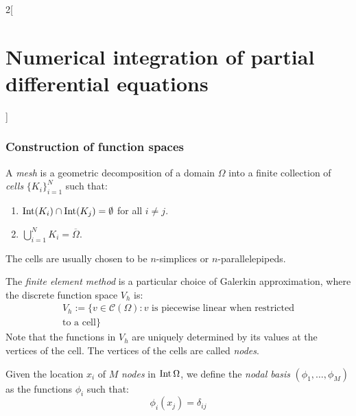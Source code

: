 \documentclass[../../../main_math.tex]{subfiles}
\begin{document}
\begin{multicols}{2}[\section{Numerical integration of partial differential equations}]
  \subsubsection{Construction of function spaces}
  \begin{definition}[Mesh]
    A \emph{mesh} is a geometric decomposition of a domain $\Omega$ into a finite collection of \emph{cells} ${\{K_i\}}_{i=1}^N$ such that:
    \begin{enumerate}
      \item $\operatorname{Int}(K_i) \cap \operatorname{Int}(K_j) = \emptyset$ for all $i\neq j$.
      \item $\bigcup_{i=1}^N K_i = \overline{\Omega}$.
    \end{enumerate}
    The cells are usually chosen to be $n$-simplices or $n$-parallelepipeds.
  \end{definition}
  \begin{definition}
    The \emph{finite element method} is a particular choice of Galerkin approximation, where the discrete function space
    $V_h$ is:
    \begin{multline*}
      V_h:=\{v\in\mathcal{C}(\Omega):v\text{ is piecewise linear when restricted}\\\text{to a cell}\}
    \end{multline*}
    Note that the functions in $V_h$ are uniquely determined by its values at the vertices of the cell. The vertices of the cells are called \emph{nodes}.
  \end{definition}
  \begin{definition}
    Given the location $x_i$ of $M$ \emph{nodes} in $\operatorname{Int}\Omega$, we define the \emph{nodal basis} $(\phi_1,\ldots,\phi_M)$ as the functions $\phi_i$ such that:
    $$\phi_i(x_j)=\delta_{ij}$$
  \end{definition}

\end{multicols}
\end{document}
